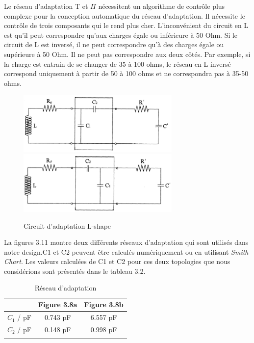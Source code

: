 \documentclass[11pt, a4paper, twoside]{book}
\begin{document}
Le réseau d'adaptation T et \(\Pi\) nécessitent un algorithme de contrôle plus complexe pour la conception automatique du réseau d'adaptation. Il nécessite le contrôle de trois composants qui le rend plus cher. L'inconvénient du circuit en L est qu'il peut correspondre qu'aux charges égale ou inférieure à 50 Ohm. Si le circuit de L est inversé, il ne peut correspondre qu'à des charges égale ou supérieure à 50 Ohm. Il ne peut pas correspondre aux deux côtés. Par exemple, si la charge est entrain de se changer de 35 à 100 ohms, le réseau en L inversé correspond uniquement à partir de 50 à 100 ohms et ne correspondra pas à 35-50 ohms.
\begin{figure}[H]
\centering
\includegraphics[width=8cm]{matcha}
\includegraphics[width=8cm]{matchb}
\caption{Circuit d'adaptation L-shape}
\end{figure}
La figures 3.11 montre deux différents réseaux d'adaptation qui sont utilisés dans notre  design.C1 et C2 peuvent être calculés numériquement ou en utilisant \emph {Smith Chart}. Les valeurs calculées de C1 et C2 pour ces deux topologies que nous considérions sont présentés dans le tableau 3.2.\\
\begin{longtable}[c]{| c | c | c |}
 \hline
  & Figure 3.8a & Figure 3.8b\\
 \hline
 \(C_{1}\) / pF & 0.743 pF & 6.557 pF\\
 \hline
 \(C_{2}\) / pF & 0.148 pF & 0.998 pF\\
 \hline
\caption{Réseau d'adaptation}
\end{longtable}
\end{document}
